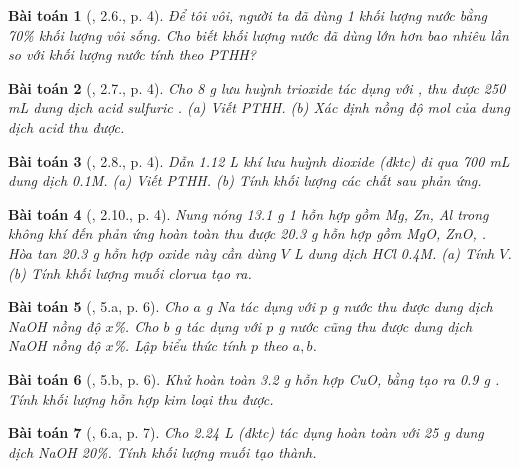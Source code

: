 \documentclass{article}
\newtheorem{baitoan}{Bài toán}
\begin{document}
\begin{baitoan}[\cite{SBT_Hoa_Hoc_9}, 2.6., p. 4]
	Để tôi vôi, người ta đã dùng 1 khối lượng nước bằng \emph{70\%} khối lượng vôi sống. Cho biết khối lượng nước đã dùng lớn hơn bao nhiêu lần so với khối lượng nước tính theo PTHH?
\end{baitoan}

\begin{baitoan}[\cite{SBT_Hoa_Hoc_9}, 2.7., p. 4]
	Cho \emph{8 g} lưu huỳnh trioxide \emph{} tác dụng với \emph{}, thu được \emph{250 mL} dung dịch acid sulfuric \emph{}. (a) Viết PTHH. (b) Xác định nồng độ mol của dung dịch acid thu được.
\end{baitoan}

\begin{baitoan}[\cite{SBT_Hoa_Hoc_9}, 2.8., p. 4]
	Dẫn \emph{1.12 L} khí lưu huỳnh dioxide (đktc) đi qua \emph{700 mL} dung dịch \emph{ 0.1M}. (a) Viết PTHH. (b) Tính khối lượng các chất sau phản ứng.
\end{baitoan}

\begin{baitoan}[\cite{SBT_Hoa_Hoc_9}, 2.10., p. 4]
	Nung nóng \emph{13.1 g} 1 hỗn hợp gồm \emph{Mg, Zn, Al} trong không khí đến phản ứng hoàn toàn thu được \emph{20.3 g} hỗn hợp gồm \emph{MgO, ZnO, }. Hòa tan \emph{20.3 g} hỗn hợp oxide này cần dùng $V$ \emph{L} dung dịch \emph{HCl 0.4M}. (a) Tính $V$. (b) Tính khối lượng muối clorua tạo ra.
\end{baitoan}

\begin{baitoan}[\cite{An_350_BT_Hoa_Hoc_9}, 5.a, p. 6]
	Cho $a$ \emph{g Na} tác dụng với $p$ \emph{g} nước thu được dung dịch \emph{NaOH} nồng độ $x$\%. Cho $b$ \emph{g } tác dụng với $p$ \emph{g} nước cũng thu được dung dịch \emph{NaOH} nồng độ $x$\%. Lập biểu thức tính $p$ theo $a,b$.
\end{baitoan}

\begin{baitoan}[\cite{An_350_BT_Hoa_Hoc_9}, 5.b, p. 6]
	Khử hoàn toàn \emph{3.2 g} hỗn hợp \emph{CuO, } bằng \emph{} tạo ra \emph{0.9 g }. Tính khối lượng hỗn hợp kim loại thu được.
\end{baitoan}

\begin{baitoan}[\cite{An_350_BT_Hoa_Hoc_9}, 6.a, p. 7]
	Cho \emph{2.24 L } (đktc) tác dụng hoàn toàn với \emph{25 g} dung dịch \emph{NaOH 20\%}. Tính khối lượng muối tạo thành.
\end{baitoan}
\end{document}
